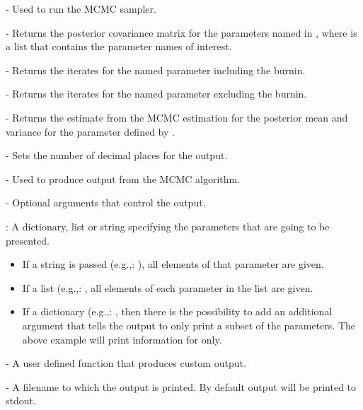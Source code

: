 \documentclass[article]{jss}
\begin{document}
\begin{description}
\item {} - Used to run the MCMC sampler. 
\item {} - Returns the posterior
  covariance matrix for the parameters named in , where
   is a list that contains the parameter names of
  interest.
\item {} - Returns the iterates for the named
  parameter including the burnin.
\item {} - Returns the iterates for
  the named parameter excluding the burnin.
\item {} - Returns the estimate from the MCMC
  estimation for the posterior mean and variance for the parameter
  defined by .
\item {} - Sets the number of decimal
  places for the output.
\item {} - Used to produce output from the
  MCMC algorithm.
  \begin{description}
  \item {} - Optional arguments that control the
    output.
    \begin{description}
    \item {}: A dictionary, list or string specifying
      the parameters that are going to be presented.
      \begin{itemize}
      \item If a string is passed (e.g.,: ),
        all elements of that parameter are given.
      \item If a list (e.g.,: , all elements of each parameter in the list are
        given.
      \item If a dictionary (e.g.,: , then there is the
        possibility to add an additional argument  that
        tells the output to only print a subset of the parameters. The
        above example will print information for  only.
      \end{itemize}
    \item {} - A user defined function that produces custom
      output.
    \item {} - A filename to which the output is printed.
      By default output will be printed to stdout.
    \end{description}
   

\end{description}
\end{description}
\end{document}
